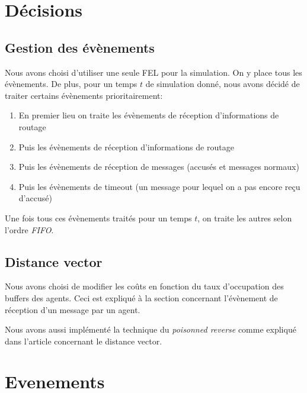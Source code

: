 \documentclass[a4paper,11pt]{article}
\begin{document}

\tableofcontents %
\listoffigures %
\lstlistoflistings
\pagebreak




\section{Décisions}

\subsection{Gestion des évènements}
Nous avons choisi d'utiliser une seule FEL pour la simulation. On y place tous les évènements. De plus, pour un temps $t$ de simulation donné, nous avons décidé de traiter certains évènements prioritairement:

\begin{enumerate}
 \item En premier lieu on traite les évènements de réception d'informations de routage
 \item Puis les évènements de réception d'informations de routage
 \item Puis les évènements de réception de messages (accusés et messages normaux)
 \item Puis les évènements de timeout (un message pour lequel on a pas encore reçu d'accusé)
\end{enumerate}

Une fois tous ces évènements traités pour un temps $t$, on traite les autres selon l'ordre \textit{FIFO}.

\subsection{Distance vector}
Nous avons choisi de modifier les coûts en fonction du taux d'occupation des buffers des agents. Ceci est expliqué à la section  concernant l'évènement de réception d'un message par un agent.

Nous avons aussi implémenté la technique du \textit{poisonned reverse} comme expliqué dans l'article concernant le distance vector.







\section{Evenements}
\end{document}

